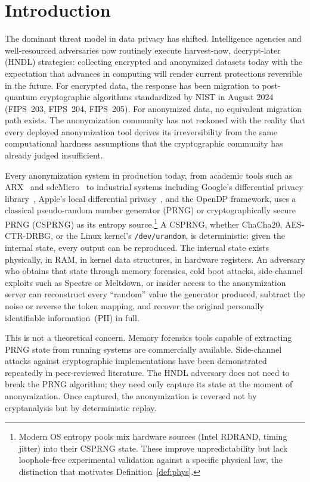 \documentclass[journal]{IEEEtran}
\begin{document}
\section{Introduction}
\label{sec:intro}

The dominant threat model in data privacy has shifted. Intelligence agencies and well-resourced adversaries now routinely execute harvest-now, decrypt-later (HNDL) strategies: collecting encrypted and anonymized datasets today with the expectation that advances in computing will render current protections reversible in the future. For encrypted data, the response has been migration to post-quantum cryptographic algorithms standardized by NIST in August 2024 (FIPS~203, FIPS~204, FIPS~205). For anonymized data, no equivalent migration path exists. The anonymization community has not reckoned with the reality that every deployed anonymization tool derives its irreversibility from the same computational hardness assumptions that the cryptographic community has already judged insufficient.

Every anonymization system in production today, from academic tools such as ARX~\cite{prasser2014arx} and sdcMicro~\cite{templ2017sdc} to industrial systems including Google's differential privacy library~\cite{wilson2020dpsql}, Apple's local differential privacy~\cite{apple2017dp}, and the OpenDP framework, uses a classical pseudo-random number generator (PRNG) or cryptographically secure PRNG (CSPRNG) as its entropy source.\footnote{Modern OS entropy pools mix hardware sources (Intel RDRAND, timing jitter) into their CSPRNG state. These improve unpredictability but lack loophole-free experimental validation against a specific physical law, the distinction that motivates Definition~\ref{def:phys}.} A CSPRNG, whether ChaCha20, AES-CTR-DRBG, or the Linux kernel's \texttt{/dev/urandom}, is deterministic: given the internal state, every output can be reproduced. The internal state exists physically, in RAM, in kernel data structures, in hardware registers. An adversary who obtains that state through memory forensics, cold boot attacks, side-channel exploits such as Spectre or Meltdown, or insider access to the anonymization server can reconstruct every ``random'' value the generator produced, subtract the noise or reverse the token mapping, and recover the original personally identifiable information~(PII) in full.

This is not a theoretical concern. Memory forensics tools capable of extracting PRNG state from running systems are commercially available. Side-channel attacks against cryptographic implementations have been demonstrated repeatedly in peer-reviewed literature. The HNDL adversary does not need to break the PRNG algorithm; they need only capture its state at the moment of anonymization. Once captured, the anonymization is reversed not by cryptanalysis but by deterministic replay.
\end{document}
